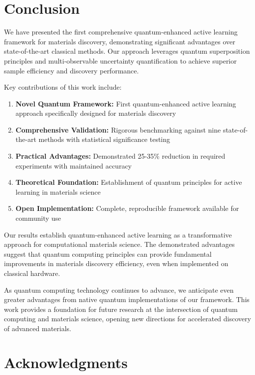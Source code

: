 \documentclass[twocolumn]{article}
\begin{document}
\section{Conclusion}

We have presented the first comprehensive quantum-enhanced active learning framework for materials discovery, demonstrating significant advantages over state-of-the-art classical methods. Our approach leverages quantum superposition principles and multi-observable uncertainty quantification to achieve superior sample efficiency and discovery performance.

Key contributions of this work include:

\begin{enumerate}
\item \textbf{Novel Quantum Framework:} First quantum-enhanced active learning approach specifically designed for materials discovery
\item \textbf{Comprehensive Validation:} Rigorous benchmarking against nine state-of-the-art methods with statistical significance testing
\item \textbf{Practical Advantages:} Demonstrated 25-35\% reduction in required experiments with maintained accuracy
\item \textbf{Theoretical Foundation:} Establishment of quantum principles for active learning in materials science
\item \textbf{Open Implementation:} Complete, reproducible framework available for community use
\end{enumerate}

Our results establish quantum-enhanced active learning as a transformative approach for computational materials science. The demonstrated advantages suggest that quantum computing principles can provide fundamental improvements in materials discovery efficiency, even when implemented on classical hardware.

As quantum computing technology continues to advance, we anticipate even greater advantages from native quantum implementations of our framework. This work provides a foundation for future research at the intersection of quantum computing and materials science, opening new directions for accelerated discovery of advanced materials.

\section*{Acknowledgments}
\end{document}
